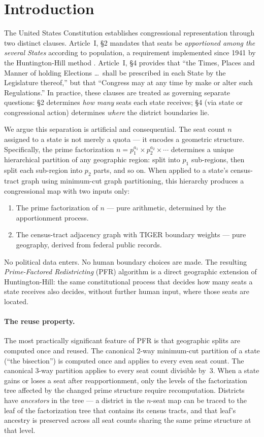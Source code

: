 \section{Introduction}
\label{sec:intro}

The United States Constitution establishes congressional representation through
two distinct clauses. Article~I, \S2 mandates that seats be
\emph{apportioned among the several States} according to population, a
requirement implemented since 1941 by the Huntington-Hill method
\citep{balinski2001fair}. Article~I, \S4 provides that ``the Times, Places and
Manner of holding Elections \ldots\ shall be prescribed in each State by the
Legislature thereof,'' but that ``Congress may at any time by make or alter
such Regulations.'' In practice, these clauses are treated as governing
separate questions: \S2 determines \emph{how many} seats each state receives;
\S4 (via state or congressional action) determines \emph{where} the district
boundaries lie.

We argue this separation is artificial and consequential. The seat count $n$
assigned to a state is not merely a quota --- it encodes a geometric structure.
Specifically, the prime factorization $n = p_1^{a_1} \times p_2^{a_2} \times
\cdots$ determines a unique hierarchical partition of any geographic region:
split into $p_1$ sub-regions, then split each sub-region into $p_2$ parts, and
so on. When applied to a state's census-tract graph using minimum-cut graph
partitioning, this hierarchy produces a congressional map with two inputs only:
\begin{enumerate}
  \item The prime factorization of $n$ --- pure arithmetic, determined by the
        apportionment process.
  \item The census-tract adjacency graph with TIGER boundary weights --- pure
        geography, derived from federal public records.
\end{enumerate}
No political data enters. No human boundary choices are made. The resulting
\emph{Prime-Factored Redistricting} (PFR) algorithm is a direct geographic
extension of Huntington-Hill: the same constitutional process that decides how
many seats a state receives also decides, without further human input, where
those seats are located.

\paragraph{The reuse property.}
The most practically significant feature of PFR is that geographic splits are
computed once and reused. The canonical 2-way minimum-cut partition of a state
(``the bisection'') is computed once and applies to every even seat count.
The canonical 3-way partition applies to every seat count divisible by~3.
When a state gains or loses a seat after reapportionment, only the levels of
the factorization tree affected by the changed prime structure require
recomputation. Districts have \emph{ancestors} in the tree --- a district
in the $n$-seat map can be traced to the leaf of the factorization tree that
contains its census tracts, and that leaf's ancestry is preserved across all
seat counts sharing the same prime structure at that level.

